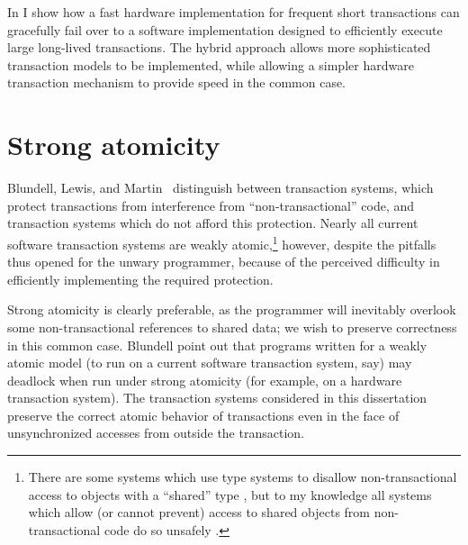 In  I show how a fast hardware implementation for
frequent short transactions can gracefully fail over to a software
implementation designed to efficiently execute large long-lived
transactions.
The hybrid approach allows more sophisticated transaction models to be
implemented, while allowing a simpler hardware transaction mechanism
to provide speed in the common case.

\section{Strong atomicity}\label{sec:strongatom}
Blundell, Lewis, and Martin~\cite{BlundellLeMa05} distinguish
between 
transaction systems, which protect transactions from interference from
``non-transactional'' code, and  transaction
systems which do not afford this
 protection.
Nearly all current software transaction systems are weakly
atomic,\footnote{There are some systems which use type systems to
disallow non-transactional access to objects with a ``shared'' type
\cite{RudysWa02, HerlihyLuMoSc03, HarrisMaPeHe05}, but to my knowledge
all systems which allow (or cannot prevent) access to shared objects
from non-transactional code do so unsafely
\cite{ShavitTo95,HarrisFr03,Herlihy05b,DiceShSh06,HerlihyLuMo06,FraserHa04}.}
however,
despite the pitfalls thus opened for the unwary programmer, because of
the perceived difficulty in efficiently implementing the required
protection.

Strong atomicity is clearly preferable, as the programmer will
inevitably overlook some non-transactional references to shared data;
we wish to preserve correctness in this common case.
Blundell \etal point out
that programs written for a weakly atomic model (to run on a current software
transaction system, say) may deadlock when run under strong atomicity
(for example, on a hardware transaction system).  The transaction
systems considered in this dissertation preserve the
correct atomic behavior of transactions even in the face of
unsynchronized accesses from outside the transaction.


